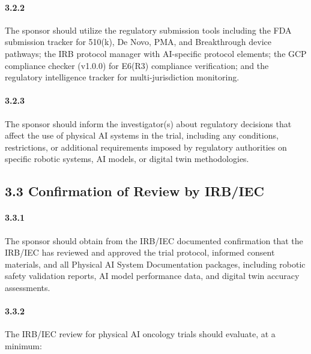 \paragraph{3.2.2} The sponsor should utilize the regulatory submission tools including the FDA submission tracker for 510(k), De Novo, PMA, and Breakthrough device pathways; the IRB protocol manager with AI-specific protocol elements; the GCP compliance checker (v1.0.0) for E6(R3) compliance verification; and the regulatory intelligence tracker for multi-jurisdiction monitoring.

\paragraph{3.2.3} The sponsor should inform the investigator(s) about regulatory decisions that affect the use of physical AI systems in the trial, including any conditions, restrictions, or additional requirements imposed by regulatory authorities on specific robotic systems, AI models, or digital twin methodologies.

\subsection{3.3 Confirmation of Review by IRB/IEC}

\paragraph{3.3.1} The sponsor should obtain from the IRB/IEC documented confirmation that the IRB/IEC has reviewed and approved the trial protocol, informed consent materials, and all Physical AI System Documentation packages, including robotic safety validation reports, AI model performance data, and digital twin accuracy assessments.

\paragraph{3.3.2} The IRB/IEC review for physical AI oncology trials should evaluate, at a minimum:

